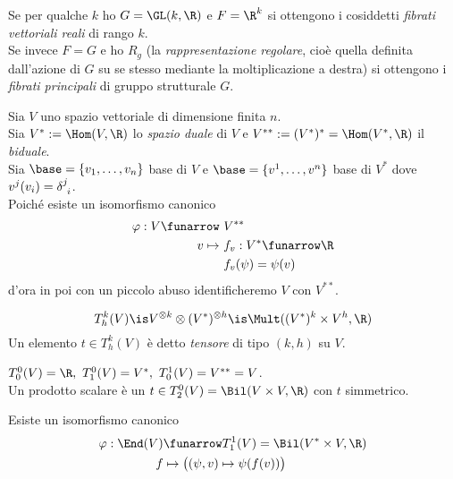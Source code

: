 \begin{defn}
	Se per qualche $k$ ho $G = \GL(k,\R)$ e $F = \R^k$ si ottengono i cosiddetti \emph{fibrati vettoriali reali} di rango $k$.\\
	Se invece $F = G$ e ho $R_g$ (la \emph{rappresentazione regolare}, cioè quella definita dall'azione di $G$ su se stesso mediante la moltiplicazione a destra) si ottengono i \emph{fibrati principali} di gruppo strutturale $G$.
\end{defn}


Sia $V$ uno spazio vettoriale di dimensione finita $n$. \\
Sia $V^* := \Hom(V,\R)$ lo \emph{spazio duale} di $V$ e $V^{**} :=(V^*)^* = \Hom(V^*,\R)$ il \emph{biduale}.\\
Sia $\base = \{v_1, \dots, v_n \}$ base di $V$ e $\base = \{ v^1, \dots, v^n \}$ base di $V^*$ dove $v^j(v_i) = \delta^j_{\hphantom{j}i}$.\\
Poiché esiste un isomorfismo canonico
\begin{align*}
	\varphi: V \funarrow\  &V^{**} \\
		     v \mapsto\  &f_v: V^* \funarrow \R \\
		                 &f_v(\psi) = \psi(v)
\end{align*}
d'ora in poi con un piccolo abuso identificheremo $V$ con $V^{**}$.

\begin{defn}[tensori]
	\[ T_h^k(V) \is V^{\otimes k} \otimes (V^*)^{\otimes h} \is \Mult( (V^*)^k \times V^h, \R) \] Un elemento $t \in T_h^k(V)$ è detto \emph{tensore} di tipo $(k,h)$ su $V$.
\end{defn}

\begin{es}
	$ T_0^0(V) = \R, \ T_1^0(V) = V^*, \ T_0^1(V) = V^{**} = V $. \\
	Un prodotto scalare è un $t \in T_2^0(V) = \Bil(V \times V, \R)$ con $t$ simmetrico.
\end{es}

\begin{oss}
	Esiste un isomorfismo canonico
\begin{align*}
	\varphi: \End(V) &\funarrow T_1^1(V) = \Bil(V^* \times V, \R) \\
				  f &\mapsto \big((\psi,v) \mapsto \psi(f(v))\big)
\end{align*}
\end{oss}

